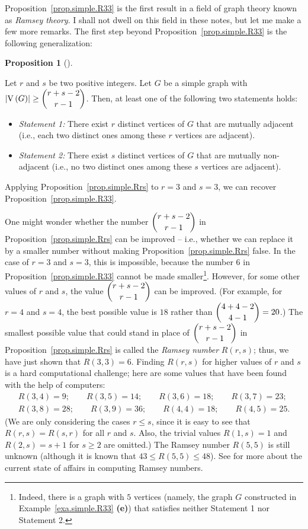 \documentclass[numbers=enddot,12pt,final,onecolumn,notitlepage]{scrartcl}%
\theoremstyle{definition}
\newtheorem{prop}[theo]{Proposition}
\newenvironment{proposition}[1][]
{\begin{prop}[#1]\begin{leftbar}}
{\end{leftbar}\end{prop}}
\newcommand{\abs}[1]{\left| #1 \right|}
\newcommand{\tup}[1]{\left( #1 \right)}
\newcommand{\verts}[1]{\operatorname{V}\left( #1 \right)}
\begin{document}
Proposition~\ref{prop.simple.R33} is the first result in a field
of graph theory known as \textit{Ramsey theory}. I shall not dwell on
this field in these notes, but let me make a few more remarks.
The first step beyond Proposition~\ref{prop.simple.R33} is the
following generalization:

\begin{proposition} \label{prop.simple.Rrs}
Let $r$ and $s$ be two positive integers.
Let $G$ be a simple graph with
$\abs{\verts{G}} \geq \dbinom{r+s-2}{r-1}$.
Then, at least one of the following two statements holds:

\begin{itemize}
\item \textit{Statement 1:} There exist $r$ distinct vertices
of $G$ that are mutually adjacent (i.e., each two distinct ones among
these $r$ vertices are adjacent).

\item \textit{Statement 2:} There exist $s$ distinct vertices
of $G$ that are mutually non-adjacent (i.e., no two distinct ones
among these $s$ vertices are adjacent).
\end{itemize}
\end{proposition}

Applying Proposition~\ref{prop.simple.Rrs} to $r=3$ and $s=3$, we can
recover Proposition~\ref{prop.simple.R33}.

One might wonder whether the number $\dbinom{r+s-2}{r-1}$ in
Proposition~\ref{prop.simple.Rrs} can be improved -- i.e., whether we
can replace it by a smaller number without making
Proposition~\ref{prop.simple.Rrs} false.
In the case of $r=3$ and $s=3$, this is impossible, because the
number $6$ in Proposition~\ref{prop.simple.R33} cannot be made
smaller\footnote{Indeed, there is a graph with $5$ vertices (namely,
the graph $G$ constructed in
Example~\ref{exa.simple.R33} \textbf{(e)}) that
satisfies neither Statement 1 nor Statement 2.}.
However, for some other values of $r$ and $s$, the value
$\dbinom{r+s-2}{r-1}$ can be improved.
(For example, for $r=4$ and $s=4$, the best possible value
is $18$ rather than $\dbinom{4+4-2}{4-1}=20$.)
The smallest possible value that could stand in place of
$\dbinom{r+s-2}{r-1}$ in Proposition~\ref{prop.simple.Rrs}
is called the \textit{Ramsey number}
$R\tup{r,s}$; thus, we have just shown that $R\tup{3,3} = 6$.
Finding $R\tup{r,s}$ for higher values of $r$ and $s$ is a
hard computational challenge; here are some values that have been
found with the help of computers:
\begin{align*}
R\tup{3,4} = 9; \qquad
R\tup{3,5} = 14; \qquad
R\tup{3,6} = 18; \qquad
R\tup{3,7} = 23; \\
R\tup{3,8} = 28; \qquad
R\tup{3,9} = 36; \qquad
R\tup{4,4} = 18; \qquad
R\tup{4,5} = 25.
\end{align*}
(We are only considering the cases $r \leq s$, since
it is easy to see that $R\tup{r,s} = R\tup{s,r}$ for all
$r$ and $s$. Also, the trivial values
$R\tup{1,s} = 1$ and $R\tup{2,s} = s+1$ for $s \geq 2$
are omitted.)
The Ramsey number $R\tup{5,5}$ is still unknown
(although it is known that $43 \leq R\tup{5,5} \leq 48$).
See \cite{Radzis21} for more about the current state of
affairs in computing Ramsey numbers.
\end{document}
